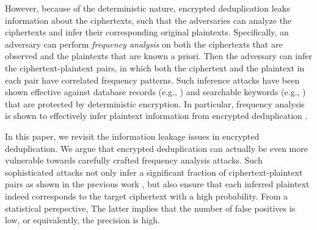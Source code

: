 \documentclass[bachelor]{thesis-uestc}
\begin{document}

However, because of the deterministic nature, encrypted deduplication leaks
information about the ciphertexts, such that the adversaries can analyze the
ciphertexts and infer their corresponding original plaintexts.  Specifically,
an adversary can perform {\em frequency analysis} \cite{alkadit92} on both the
ciphertexts that are observed and the plaintexts that are known a priori.
Then the adversary can infer the ciphertext-plaintext pairs, in which both the
ciphertext and the plaintext in each pair have correlated frequency patterns. 
Such inference attacks have been shown effective against database records (e.g.,
\cite{lacharite18,grubbs17,kellaris16,naveed15,bindschaedler17,durak16}) and
searchable keywords (e.g., \cite{pouliot16,zhang16b,cash15,islam12,grubbs16})
that are protected by deterministic encryption.   In particular, frequency
analysis is shown to effectively infer plaintext information from encrypted
deduplication \cite{li17}. 

In this paper, we revisit the information leakage issues in encrypted
deduplication.  We argue that encrypted deduplication can actually be even
more vulnerable towards carefully crafted frequency analysis attacks.  Such
sophisticated attacks not only infer a significant fraction of
ciphertext-plaintext pairs as shown in the previous work \cite{li17}, but also
ensure that each inferred plaintext indeed corresponds to the target
ciphertext with a high probability.  From a statistical perspective, The
latter implies that the number of false positives is low, or equivalently, the
precision is high. 
\end{document}
